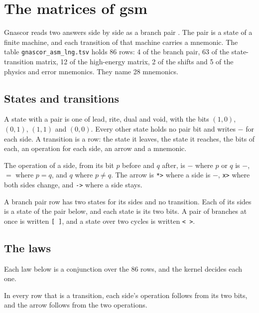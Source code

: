 \chapter{The matrices of gsm}
\label{ch:gsm}

Gnascor reads two answers side by side as a branch pair \cite{src:gnascor}. The pair is a state of a finite
machine, and each transition of that machine carries a mnemonic. The table \texttt{gnascor\_asm\_lng.tsv} holds 86
rows: 4 of the branch pair, 63 of the state-transition matrix, 12 of the high-energy matrix, 2 of the shifts and 5
of the physics and error mnemonics. They name 28 mnemonics.

\section{States and transitions}

\begin{definition}
A state with a pair is one of lead, rite, dual and void, with the bits $(1,0)$, $(0,1)$, $(1,1)$ and $(0,0)$. Every
other state holds no pair bit and writes $-$ for each side. A transition is a row: the state it leaves, the state
it reaches, the bits of each, an operation for each side, an arrow and a mnemonic.
\end{definition}

\begin{definition}
The operation of a side, from its bit $p$ before and $q$ after, is $-$ where $p$ or $q$ is $-$, $=$ where $p = q$,
and $q$ where $p \neq q$. The arrow is \texttt{*>} where a side is $-$, \texttt{x>} where both sides change, and
\texttt{->} where a side stays.
\end{definition}

A branch pair row has two states for its sides and no transition. Each of its sides is a state of the pair below,
and each state is its two bits. A pair of branches at once is written \texttt{[ ]}, and a state over two cycles
is written \texttt{< >}.

\section{The laws}

Each law below is a conjunction over the 86 rows, and the kernel decides each one.

\begin{theorem}
In every row that is a transition, each side's operation follows from its two bits, and the arrow follows from the
two operations.
\end{theorem}

